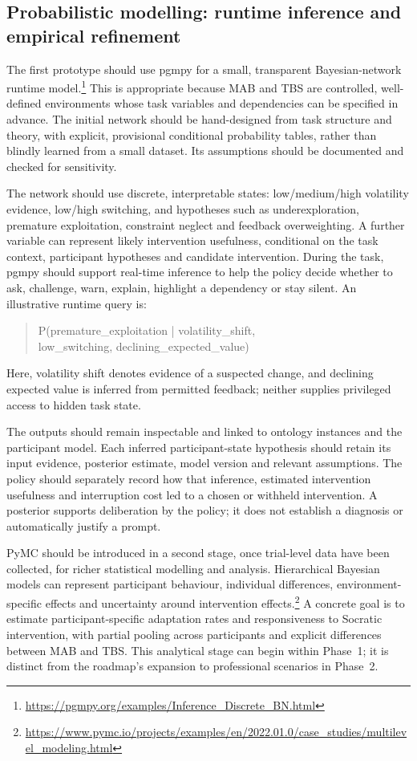 \documentclass[11pt,a4paper]{article}
\begin{document}
\subsection{Probabilistic modelling: runtime inference and empirical refinement}
The first prototype should use pgmpy for a small, transparent Bayesian-network runtime model.\footnote{\url{https://pgmpy.org/examples/Inference_Discrete_BN.html}} This is appropriate because MAB and TBS are controlled, well-defined environments whose task variables and dependencies can be specified in advance. The initial network should be hand-designed from task structure and theory, with explicit, provisional conditional probability tables, rather than blindly learned from a small dataset. Its assumptions should be documented and checked for sensitivity.

The network should use discrete, interpretable states: low/medium/high volatility evidence, low/high switching, and hypotheses such as underexploration, premature exploitation, constraint neglect and feedback overweighting. A further variable can represent likely intervention usefulness, conditional on the task context, participant hypotheses and candidate intervention. During the task, pgmpy should support real-time inference to help the policy decide whether to ask, challenge, warn, explain, highlight a dependency or stay silent. An illustrative runtime query is:
\begin{quote}\small\ttfamily
P(premature\_exploitation | volatility\_shift,\\
\hspace*{1em}low\_switching, declining\_expected\_value)
\end{quote}
Here, volatility shift denotes evidence of a suspected change, and declining expected value is inferred from permitted feedback; neither supplies privileged access to hidden task state.

The outputs should remain inspectable and linked to ontology instances and the participant model. Each inferred participant-state hypothesis should retain its input evidence, posterior estimate, model version and relevant assumptions. The policy should separately record how that inference, estimated intervention usefulness and interruption cost led to a chosen or withheld intervention. A posterior supports deliberation by the policy; it does not establish a diagnosis or automatically justify a prompt.

PyMC should be introduced in a second stage, once trial-level data have been collected, for richer statistical modelling and analysis. Hierarchical Bayesian models can represent participant behaviour, individual differences, environment-specific effects and uncertainty around intervention effects.\footnote{\url{https://www.pymc.io/projects/examples/en/2022.01.0/case_studies/multilevel_modeling.html}} A concrete goal is to estimate participant-specific adaptation rates and responsiveness to Socratic intervention, with partial pooling across participants and explicit differences between MAB and TBS. This analytical stage can begin within Phase~1; it is distinct from the roadmap's expansion to professional scenarios in Phase~2.
\end{document}
